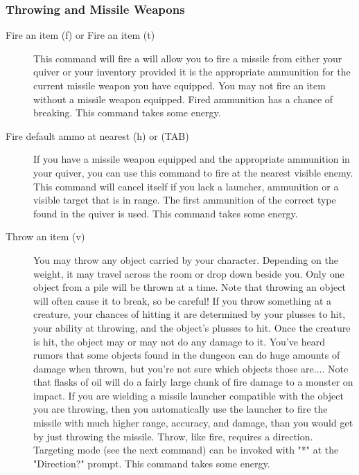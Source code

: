 \subsubsection{Throwing and Missile Weapons} 
\begin{description}
\item[Fire an item (f) or Fire an item (t)]
  This command will fire a will allow you to fire a missile from either
  your quiver or your inventory provided it is the appropriate ammunition
  for the current missile weapon you have equipped.  You may not fire an
  item without a missile weapon equipped. Fired ammunition has a chance of
  breaking. This command takes some energy.

\item[Fire default ammo at nearest (h) or (TAB)]
  If you have a missile weapon equipped and the appropriate ammunition in
  your quiver, you can use this command to fire at the nearest visible
  enemy. This command will cancel itself if you lack a launcher,
  ammunition or a visible target that is in range. The first ammunition of
  the correct type found in the quiver is used.  This command takes some
  energy.

\item[Throw an item (v)]
  You may throw any object carried by your character.  Depending on the
  weight, it may travel across the room or drop down beside you.  Only one
  object from a pile will be thrown at a time. Note that throwing an
  object will often cause it to break, so be careful!  If you throw
  something at a creature, your chances of hitting it are determined by
  your plusses to hit, your ability at throwing, and the object's plusses to
  hit. Once the creature is hit, the object may or may not do any damage
  to it. You've heard rumors that some objects found in the dungeon can do
  huge amounts of damage when thrown, but you're not sure which objects
  those are.... Note that flasks of oil will do a fairly large chunk of
  fire damage to a monster on impact. If you are wielding a missile
  launcher compatible with the object you are throwing, then you
  automatically use the launcher to fire the missile with much higher
  range, accuracy, and damage, than you would get by just throwing the
  missile. Throw, like fire, requires a direction. Targeting mode (see the
  next command) can be invoked with "*" at the "Direction?"  prompt. This
  command takes some energy.


\end{description}
